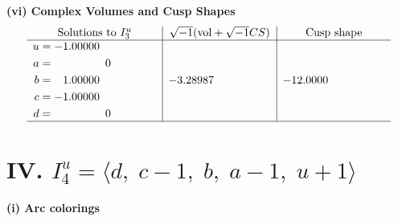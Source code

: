\documentclass[1p]{elsarticle_modified}
\theoremstyle{definition}
\newcommand{\I}{\sqrt{-1}}
\begin{document}
\newpage\flushleft \textbf{(vi) Complex Volumes and Cusp Shapes}
$$\begin{array}{c|c|c}  
\text{Solutions to }I^u_{3}& \I (\text{vol} + \sqrt{-1}CS) & \text{Cusp shape}\\
 \hline 
\begin{aligned}
u &= -1.00000\phantom{ +0.000000I} \\
a &= \phantom{-0.000000 } 0 \\
b &= \phantom{-}1.00000\phantom{ +0.000000I} \\
c &= -1.00000\phantom{ +0.000000I} \\
d &= \phantom{-0.000000 } 0\end{aligned}
 & -3.28987\phantom{ +0.000000I} & -12.0000\phantom{ +0.000000I}\\
 \hline 
 \end{array}$$\newpage\newpage\renewcommand{\arraystretch}{1}
\centering \section*{IV. $I^u_{4}= \langle d,\;c-1,\;b,\;a-1,\;u+1 \rangle$}
\flushleft \textbf{(i) Arc colorings}\\
\end{document}
